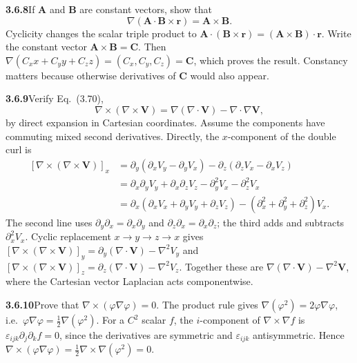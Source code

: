 \par\bigskip
\noindent\textbf{3.6.8}\quad If $\mathbf{A}$ and $\mathbf{B}$ are constant
vectors, show that
\[
\nabla(\mathbf{A}\cdot\mathbf{B}\times\mathbf{r})=\mathbf{A}\times\mathbf{B}.
\]
\solution
Cyclicity changes the scalar triple product to
$\mathbf A\cdot(\mathbf B\times\mathbf r)
=(\mathbf A\times\mathbf B)\cdot\mathbf r$.
Write the constant vector $\mathbf A\times\mathbf B=\mathbf C$.
Then
$\nabla(C_xx+C_yy+C_zz)=(C_x,C_y,C_z)=\mathbf C$,
which proves the result. Constancy matters because otherwise derivatives
of $\mathbf C$ would also appear.

\par\bigskip
\noindent\textbf{3.6.9}\quad Verify Eq.~(3.70),
\[
\nabla\times(\nabla\times\mathbf{V})
=\nabla(\nabla\cdot\mathbf{V})-\nabla\cdot\nabla\mathbf{V},
\]
by direct expansion in Cartesian coordinates.
\solution
Assume the components have commuting mixed second derivatives.
Directly, the $x$-component of the double curl is
\[
\begin{aligned}
{}[\nabla\times(\nabla\times\mathbf V)]_x
&=\partial_y(\partial_xV_y-\partial_yV_x)
-\partial_z(\partial_zV_x-\partial_xV_z)\\
&=\partial_x\partial_yV_y+\partial_x\partial_zV_z
-\partial_y^2V_x-\partial_z^2V_x\\
&=\partial_x(\partial_xV_x+\partial_yV_y+\partial_zV_z)
-(\partial_x^2+\partial_y^2+\partial_z^2)V_x.
\end{aligned}
\]
The second line uses $\partial_y\partial_x=\partial_x\partial_y$ and
$\partial_z\partial_x=\partial_x\partial_z$; the third adds and
subtracts $\partial_x^2V_x$.
Cyclic replacement $x\to y\to z\to x$ gives
$[\nabla\times(\nabla\times\mathbf V)]_y=\partial_y(\nabla\cdot\mathbf V)-\nabla^2V_y$
and
$[\nabla\times(\nabla\times\mathbf V)]_z=\partial_z(\nabla\cdot\mathbf V)-\nabla^2V_z$.
Together these are $\nabla(\nabla\cdot\mathbf V)-\nabla^2\mathbf V$,
where the Cartesian vector Laplacian acts componentwise.

\par\bigskip
\noindent\textbf{3.6.10}\quad Prove that
$\nabla\times(\varphi\nabla\varphi)=0$.
\solution
The product rule gives $\nabla(\varphi^2)=2\varphi\nabla\varphi$, i.e.\
$\varphi\nabla\varphi=\frac12\nabla(\varphi^2)$.
For a $C^2$ scalar $f$, the $i$-component of
$\nabla\times\nabla f$ is $\varepsilon_{ijk}\partial_j\partial_k f=0$,
since the derivatives are symmetric and $\varepsilon_{ijk}$ antisymmetric.
Hence $\nabla\times(\varphi\nabla\varphi)=\frac12\nabla\times\nabla(\varphi^2)=0$.

